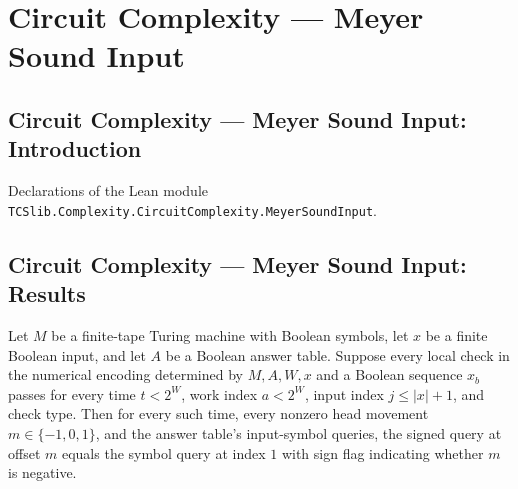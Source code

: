\section{Circuit Complexity --- Meyer Sound Input}
\subsection*{Circuit Complexity --- Meyer Sound Input: Introduction}

Declarations of the Lean module \texttt{TCSlib.Complexity.CircuitComplexity.MeyerSoundInput}.

\subsection*{Circuit Complexity --- Meyer Sound Input: Results}

\begin{theorem}
\label{Complexity.Meyer.clamp_cX}
\leanok
{}
Let $M$ be a finite-tape Turing machine with Boolean symbols, let $x$ be a finite
Boolean input, and let $A$ be a Boolean answer table. Suppose every local check in the
numerical encoding determined by $M,A,W,x$ and a Boolean sequence $x_b$ passes for every
time $t<2^W$, work index $a<2^W$, input index $j\le |x|+1$, and check type. Then for
every such time, every nonzero head movement $m\in\{-1,0,1\}$, and the answer table's
input-symbol queries, the signed query at offset $m$ equals the symbol query at index
$1$ with sign flag indicating whether $m$ is negative.
\end{theorem}

